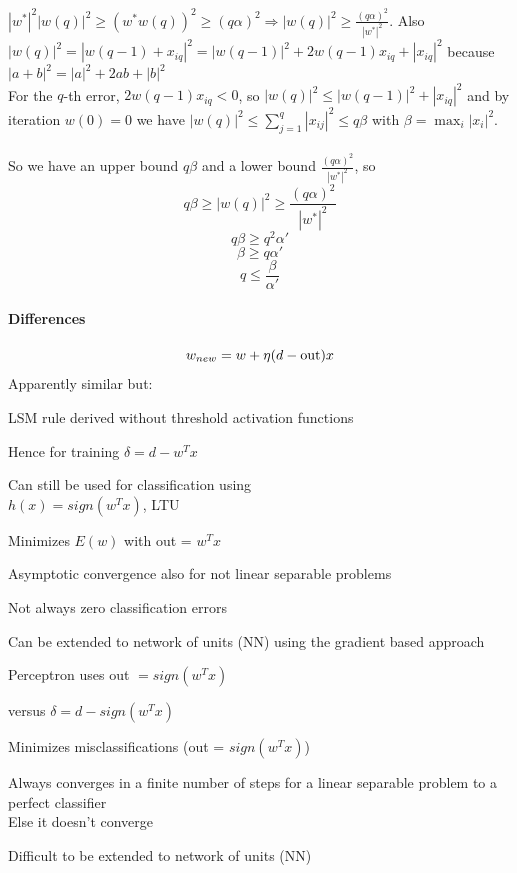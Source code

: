 \documentclass[10pt]{report}
\begin{document}
$|w^*|^2|w(q)|^2 \geq (w^*w(q))^2 \geq (q\alpha)^2 \Rightarrow |w(q)|^2 \geq \frac{(q\alpha)^2}{|w^*|^2}$. Also $|w(q)|^2 = |w(q-1)+ x_{iq}|^2 = |w(q-1)|^2 + 2w(q-1)x_{iq} + |x_{iq}|^2$ because $|a + b|^2 = |a|^2 + 2ab + |b|^2$\\
For the $q$-th error, $2w(q-1)x_{iq} < 0$, so $|w(q)|^2 \leq |w(q-1)|^2 + |x_{iq}|^2$ and by iteration $w(0) = 0$ we have $|w(q)|^2 \leq \sum_{j=1}^q |x_{ij}|^2 \leq q\beta$ with $\beta = \max_i |x_i|^2$.\\\\
So we have an upper bound $q\beta$ and a lower bound $\frac{(q\alpha)^2}{|w^*|^2}$, so $$q\beta\geq |w(q)|^2\geq \frac{(q\alpha)^2}{|w^*|^2}$$ $$q\beta\geq q^2\alpha'$$ $$\beta\geq q\alpha'$$ $$q \leq \frac{\beta}{\alpha'}$$
\pagebreak
\paragraph{Differences}
	$$w_{new} = w + \eta(d-\hbox{out})x$$
Apparently similar but:
\begin{multicols}{2}
	\begin{list}{}{\textbf{LMS algorithm}}
		\item LSM rule derived without threshold activation functions
		\item Hence for training $\delta = d - w^Tx$
		\item Can still be used for classification using\\$h(x) = sign(w^T x)$, LTU
		\item Minimizes $E(w)$ with out = $w^Tx$
		\item Asymptotic convergence also for not linear separable problems
		\item Not always zero classification errors
		\item Can be extended to network of units (NN) using the gradient based approach
	\end{list}
	\begin{list}{}{\textbf{Perceptron learning algorithm}}
		\item Perceptron uses out $= sign(w^Tx)$
		\item versus $\delta = d - sign(w^Tx)$
		\item
		\item Minimizes misclassifications (out = $sign(w^Tx)$)
		\item Always converges in a finite number of steps for a linear separable problem to a perfect classifier\\
		Else it doesn't converge
		\item 
		\item Difficult to be extended to network of units (NN)
	\end{list}
\end{multicols}
\end{document}
